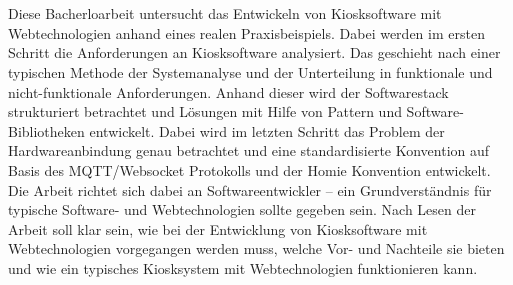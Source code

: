 \chapter{\abstractname}

Diese Bacherloarbeit untersucht das Entwickeln von Kiosksoftware mit Webtechnologien
anhand eines realen Praxisbeispiels. Dabei werden im ersten Schritt die Anforderungen
an Kiosksoftware analysiert. Das geschieht nach einer typischen Methode der Systemanalyse
und der Unterteilung in funktionale und nicht-funktionale Anforderungen. Anhand dieser
wird der Softwarestack strukturiert betrachtet und Lösungen mit Hilfe von Pattern und 
Software-Bibliotheken entwickelt. Dabei wird im letzten Schritt das Problem der
Hardwareanbindung genau betrachtet und eine standardisierte Konvention auf
Basis des MQTT/Websocket Protokolls und der Homie Konvention entwickelt.\\
Die Arbeit richtet sich dabei an Softwareentwickler -- ein Grundverständnis für typische 
Software- und Webtechnologien sollte gegeben sein. Nach Lesen der Arbeit soll klar sein,
wie bei der Entwicklung von Kiosksoftware mit Webtechnologien vorgegangen werden muss, welche
Vor- und Nachteile sie bieten und wie ein typisches Kiosksystem mit Webtechnologien funktionieren
kann. \\

\iffalse
- wie typische Anforderungen an Kiosksoftware mit Webtechnologien erfüllt werden können
- zum Beispiel Offline Verfügbarkeit und Geschlosssenheit 
\fi

